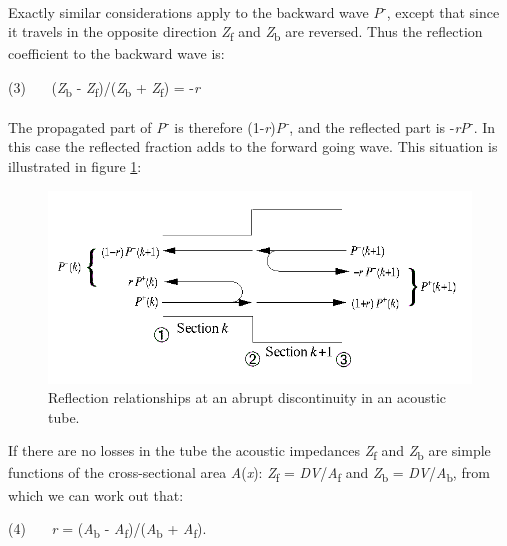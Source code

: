 \bigskip

Exactly similar considerations apply to the backward wave \textit{P}\textsuperscript{-}, except that since it travels in the opposite direction \textit{Z}\textsubscript{f} and \textit{Z}\textsubscript{b} are reversed. Thus the reflection coefficient to the backward wave is:

\bigskip

(3)~~~ (\textit{Z}\textsubscript{b} - \textit{Z}\textsubscript{f})/(\textit{Z}\textsubscript{b} + \textit{Z}\textsubscript{f}) = -\textit{r}

\bigskip

The propagated part of \textit{P}\textsuperscript{-} is therefore (1-\textit{r})\textit{P\textsuperscript{-}}, and the reflected part is -\textit{rP}\textsuperscript{-}. In this case the reflected fraction adds to the forward going wave. This situation is illustrated in figure \ref{f5}:\\

\begin{figure}[htbp]
\begin{center}
\includegraphics[width=\textwidth]{mp/img/reflections.png}
\caption{Reflection relationships at an abrupt discontinuity in an acoustic tube.}
\label{f5}
\end{center}
\end{figure}


If there are no losses in the tube the acoustic impedances \textit{Z}\textsubscript{f} and \textit{Z}\textsubscript{b} are simple functions of the cross-sectional area \textit{A}(\textit{x}): \textit{Z}\textsubscript{f} = \textit{DV}/\textit{A}\textsubscript{f} and \textit{Z}\textsubscript{b} = \textit{DV}/\textit{A}\textsubscript{b}, from which we can work out that:

\bigskip

(4)~~~ \textit{r} = (\textit{A}\textsubscript{b} - \textit{A}\textsubscript{f})/(\textit{A}\textsubscript{b} + \textit{A}\textsubscript{f}).

